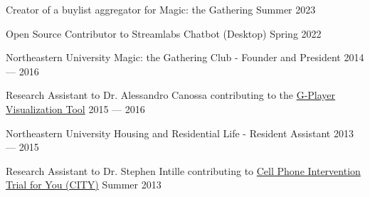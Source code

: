 
Creator of a buylist aggregator for Magic: the Gathering  \hfill Summer 2023

Open Source Contributor to Streamlabs Chatbot (Desktop) \hfill Spring 2022


Northeastern University Magic: the Gathering Club - Founder and President   \hfill 2014 --- 2016

Research Assistant to Dr. Alessandro Canossa contributing to the \href{https://github.com/spacial-player-data-visualization/g-player-visualization}{G-Player Visualization Tool}   \hfill 2015 --- 2016

Northeastern University Housing and Residential Life - Resident Assistant   \hfill 2013 --- 2015

Research Assistant to Dr. Stephen Intille contributing to   \href{https://www.mhealthgroup.org/projects.html}{Cell Phone Intervention Trial for You (CITY)}   \hfill Summer 2013


